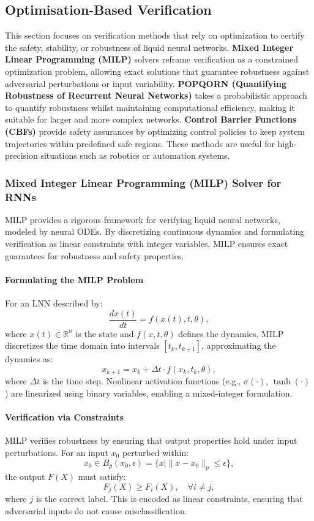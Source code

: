 \subsection{Optimisation-Based Verification}

This section focuses on verification methods that rely on optimization to certify the safety, stability, or robustness of liquid neural networks. \textbf{Mixed Integer Linear Programming (MILP)} solvers reframe verification as a constrained optimization problem, allowing exact solutions that guarantee robustness against adversarial perturbations or input variability. \textbf{POPQORN (Quantifying Robustness of Recurrent Neural Networks)} takes a  probabilistic approach to quantify robustness whilst maintaining computational efficiency, making it suitable for larger and more complex networks. \textbf{Control Barrier Functions (CBFs)} provide safety assurances by optimizing control policies to keep system trajectories within predefined safe regions. These methods are useful for high-precision situations such as robotics or automation systems.


\subsubsection{Mixed Integer Linear Programming (MILP) Solver for RNNs}

MILP provides a rigorous framework for verifying liquid neural networks, modeled by neural ODEs. By discretizing continuous dynamics and formulating verification as linear constraints with integer variables, MILP ensures exact guarantees for robustness and safety properties.

\paragraph{Formulating the MILP Problem}
For an LNN described by:
\[
\frac{dx(t)}{dt} = f(x(t), t, \theta),
\]
where \(x(t) \in \mathbb{R}^n\) is the state and \(f(x, t, \theta)\) defines the dynamics, MILP discretizes the time domain into intervals \([t_k, t_{k+1}]\), approximating the dynamics as:
\[
x_{k+1} = x_k + \Delta t \cdot f(x_k, t_k, \theta),
\]
where \(\Delta t\) is the time step. Nonlinear activation functions (e.g., \(\sigma(\cdot)\), \(\tanh(\cdot)\)) are linearized using binary variables, enabling a mixed-integer formulation.

\paragraph{Verification via Constraints}
MILP verifies robustness by ensuring that output properties hold under input perturbations. For an input \(x_0\) perturbed within:
\[
x_0 \in B_p(x_0, \epsilon) = \{x \mid \|x - x_0\|_p \leq \epsilon\},
\]
the output \(F(X)\) must satisfy:
\[
F_j(X) \geq F_i(X), \quad \forall i \neq j,
\]
where \(j\) is the correct label. This is encoded as linear constraints, ensuring that adversarial inputs do not cause misclassification.

